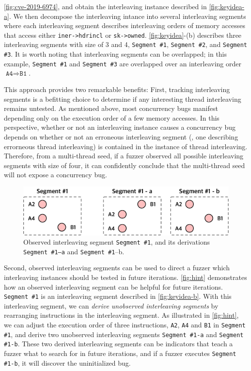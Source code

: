 \autoref{fig:cve-2019-6974}, and obtain the interleaving instance
described in \autoref{fig:keyidea-a}.
%
We then decompose the interleaving intance into several interleaving
segments where each interleaving segment describes interleaving orders
of memory accesses that access either \texttt{iner->hdrincl} or
\texttt{sk->owned}.
%
\autoref{fig:keyidea}-(b) describes three interleaving segments with
size of 3 and 4, \texttt{Segment \#1}, \texttt{Segment \#2}, and
\texttt{Segment \#3}.
%
It is worth noting that interleaving segments can be overlapped; in
this example, \texttt{Segment \#1} and \texttt{Segment \#3} are
overlapped over an interleaving order
$\texttt{A4} \Rightarrow \texttt{B1}$.




%
This approach provides two remarkable benefits:
%
First, tracking interleaving segments is a befitting choice to
determine if any interesting thread interleaving remains untested.
%
As mentioned above, most concurrency bugs manifest depending only on
the execution order of a few memory accesses.
%
In this perspective, whether or not an interleaving instance causes a
concurrency bug depends on whether or not an erroneous interleaving
segment (\ie, one describing errorneous thread interleaving) is
contained in the instance of thread interleaving.
%
Therefore, from a multi-thread seed, if a fuzzer observed all possible
interleaving segments with size of four, it can confidently conclude
that the multi-thread seed will not expose a concurrency bug.
%



\begin{figure}[t]
  \centering
  \includegraphics[width=0.9\linewidth]{fig/hint.pdf}
  \caption{Observed interleaving segment \texttt{Segment \#1}, and its
    derivations \texttt{Segment \#1--a} and \texttt{Segment \#1}--b.}
  \label{fig:hint}
\end{figure}
%
Second, observed interleaving segments can be used to direct a fuzzer
which interleaving instances should be tested in future iterations.
%
\autoref{fig:hint} demonstrates how an observed interleaving segment
can be helpful for future iterations.
%
\texttt{Segment \#1} is an interleaving segment described in
\autoref{fig:keyidea-b}.
%
With this interleaving segment, we can \textit{derive unobserved
  interleaving segments} by rearranging instructions in the
interleaving segment.
%
As illustrated in \autoref{fig:hint}, we can adjust the execution
order of three instructions, \texttt{A2}, \texttt{A4} and \texttt{B1}
in \texttt{Segment \#1}, and derive two unobserved interleaving
segments \texttt{Segment \#1-a} and \texttt{Segment \#1-b}.
%
These two derived interleaving segments can be indicators that teach a
fuzzer what to search for in future iterations, and if a fuzzer
executes \texttt{Segment \#1-b}, it will discover the uninitialized
bug.




